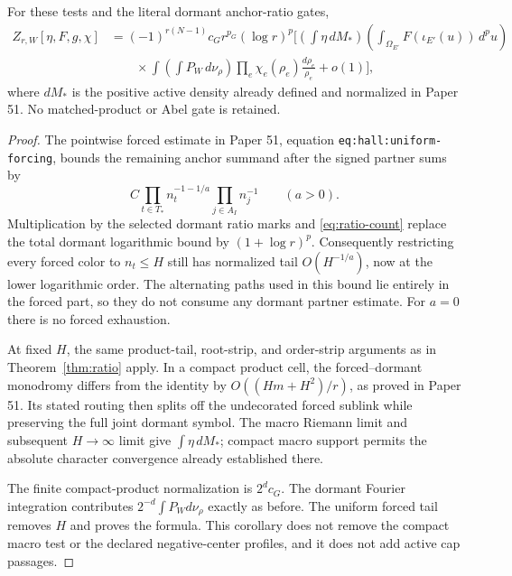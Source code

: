 \begin{corollary}
\label{cor:ratio-hall}
For these tests and the literal dormant anchor-ratio gates,
\begin{align*}
 Z_{r,W}[\eta,F,g,\chi]
 &=(-1)^{r(N-1)}c_G r^{p_G}(\log r)^p
 \bigg[
 \left(\int\eta\,dM_*\right)
 \left(\int_{\Omega_{E'}}F(\iota_{E'}(u))\,d^pu\right)\\
 &\qquad\times
 \int\left(\int P_W\,d\nu_\rho\right)
       \prod_e\chi_e(\rho_e)\frac{d\rho_e}{\rho_e}+o(1)\bigg],
\end{align*}
where $dM_*$ is the positive active density already defined and
normalized in Paper 51. No matched-product or Abel gate is retained.
\end{corollary}
\begin{proof}
The pointwise forced estimate in Paper 51,
equation \texttt{eq:hall:uniform-forcing}, bounds the remaining
anchor summand after the signed partner sums by
\[
 C\prod_{t\in T_*}n_t^{-1-1/a}\prod_{j\in A_I}n_j^{-1}
 \qquad (a>0).
\]
Multiplication by the selected dormant ratio marks and
\eqref{eq:ratio-count} replace the total dormant logarithmic bound
by $(1+\log r)^p$. Consequently restricting every forced color to
$n_t\le H$ still has normalized tail $O(H^{-1/a})$, now at the
lower logarithmic order. The alternating paths used in this bound
lie entirely in the forced part, so they do not consume any dormant
partner estimate. For $a=0$ there is no forced exhaustion.

At fixed $H$, the same product-tail, root-strip, and order-strip
arguments as in Theorem~\ref{thm:ratio} apply. In a compact product
cell, the forced--dormant monodromy differs from the identity by
$O((Hm+H^2)/r)$, as proved in Paper 51. Its stated routing then splits
off the undecorated forced sublink while preserving the full joint
dormant symbol. The macro Riemann limit and subsequent $H\to\infty$
limit give $\int\eta\,dM_*$; compact macro support permits the
absolute character convergence already established there.

The finite compact-product normalization is $2^dc_G$. The dormant
Fourier integration contributes $2^{-d}\int P_Wd\nu_\rho$ exactly
as before. The uniform forced tail removes $H$ and proves the formula.
This corollary does not remove the compact macro test or the declared
negative-center profiles, and it does not add active cap passages.
\end{proof}

